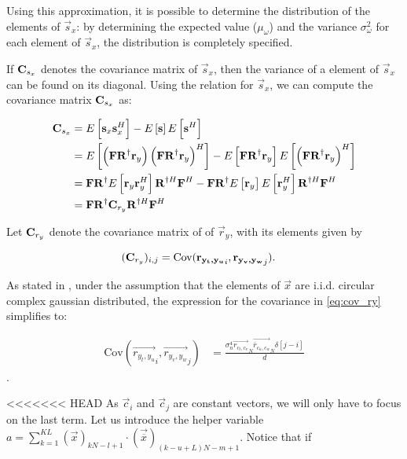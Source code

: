 \documentclass[a4paper, openany, oneside]{memoir}
\begin{document}
Using this approximation, it is possible to determine the distribution of the elements  of $\vec{s}_x$: by determining the expected value ($\mu_{\omega}$) and the variance $\sigma_{\omega}^2$ for each element of $\vec{s}_x$, the distribution is completely specified.

If $\boldsymbol{\mathbf{C}}_{s_x}$ denotes the covariance matrix of $\vec{s}_x$, then the variance of a element of $\vec{s}_x$ can be found on its diagonal.
Using the relation for $\vec{s}_x$, we can compute the covariance matrix $\boldsymbol{\mathbf{C}}_{s_x}$ as:

\begin{align*}
\boldsymbol{\mathbf{C}}_{s_x} &= E\left[\boldsymbol{\mathbf{s}}_x\boldsymbol{\mathbf{s}}_x^H\right] - E\left[\boldsymbol{\mathbf{s}}\right]E\left[\boldsymbol{\mathbf{s}}^H\right] \\
&= E\left[\left(\boldsymbol{\mathbf{F}} \boldsymbol{\mathbf{R}}^{\dagger}\boldsymbol{\mathbf{r}}_y\right) \left( \boldsymbol{\mathbf{F}}\boldsymbol{\mathbf{R}}^{\dagger}\boldsymbol{\mathbf{r}}_y\right)^H\right] - E\left[\boldsymbol{\mathbf{F}}\boldsymbol{\mathbf{R}}^{\dagger}\boldsymbol{\mathbf{r}}_y\right]E\left[\left(\boldsymbol{\mathbf{F}}\boldsymbol{\mathbf{R}}^{\dagger}\boldsymbol{\mathbf{r}}_y\right)^H\right] \\
&= \boldsymbol{\mathbf{F}}\boldsymbol{\mathbf{R}}^{\dagger} E\left[ \boldsymbol{\mathbf{r}}_y\boldsymbol{\mathbf{r}}_y^H\right]  \boldsymbol{\mathbf{R}}^{\dagger H}\boldsymbol{\mathbf{F}}^H -  \boldsymbol{\mathbf{F}}\boldsymbol{\mathbf{R}}^{\dagger} E\left[ \boldsymbol{\mathbf{r}}_y\right] E\left[\boldsymbol{\mathbf{r}}_y^H\right]   \boldsymbol{\mathbf{R}}^{\dagger H}\boldsymbol{\mathbf{F}}^H \\
&= \boldsymbol{\mathbf{F}}\boldsymbol{\mathbf{R}}^{\dagger} \boldsymbol{\mathbf{C}}_{r_y} \boldsymbol{\mathbf{R}}^{\dagger H}\boldsymbol{\mathbf{F}}^H
\end{align*}

Let $\boldsymbol{\mathbf{C}}_{r_y}$ denote the covariance matrix of of $\vec{r}_y$, with its elements given by

\begin{align}\label{eq:cov_ry}
(\boldsymbol{\mathbf{C}}_{r_y})_{i,j} &= \text{Cov}(\boldsymbol{\mathbf{r_{y_t,y_u}}}_i,\boldsymbol{\mathbf{r_{y_v, y_w}}}_j).
\end{align}

As stated in \cite{ariananda2012compressive}, under the assumption that the elements of $\vec{x}$ are i.i.d. circular complex gaussian distributed, the expression for the covariance in \cref{eq:cov_ry} simplifies to:

\begin{align*}
\text{Cov}(\vec{r_{y_t,y_u}}_i,\vec{r_{y_v, y_w}}_j) &= \frac{\sigma_n^4 \vec{r_{c_t,c_v}}_N \vec{\overline{r}_{c_u,c_w}}_N \delta \left[ j-i\right]}{d}
\end{align*}.

<<<<<<< HEAD
As $\vec{c}_i$ and $\vec{c}_j$ are constant vectors, we will only have to focus on the last term. Let us introduce the helper variable $a =  \sum_{k=1}^{KL} (\vec{x})_{kN-l+1} \cdot (\vec{\overline{x}})_{(k-u+L)N - m+1}$. Notice that if
\end{document}

